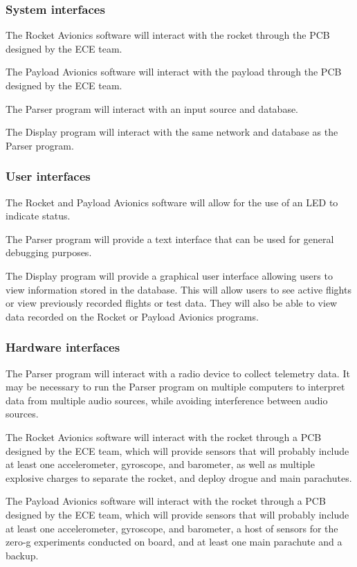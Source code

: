 \documentclass[onecolumn, draftclsnofoot, 10pt, compsoc]{IEEEtran}
\begin{document}
\subsubsection{System interfaces}
The Rocket Avionics software will interact with the rocket through the PCB designed by the ECE team.

The Payload Avionics software will interact with the payload through the PCB designed by the ECE team.

The Parser program will interact with an input source and database.

The Display program will interact with the same network and database as the Parser program.

\subsubsection{User interfaces}
The Rocket and Payload Avionics software will allow for the use of an LED to indicate status.

The Parser program will provide a text interface that can be used for general debugging purposes.

The Display program will provide a graphical user interface allowing users to view information stored in the database. This will allow users to see active flights or view previously recorded flights or test data.  They will also be able to view data recorded on the Rocket or Payload Avionics programs.

\subsubsection{Hardware interfaces}
The Parser program will interact with a radio device to collect telemetry data.  It may be necessary to run the Parser program on multiple computers to interpret data from multiple audio sources, while avoiding interference between audio sources.

The Rocket Avionics software will interact with the rocket through a PCB designed by the ECE team, which will provide sensors that will probably include at least one accelerometer, gyroscope, and barometer, as well as multiple explosive charges to separate the rocket, and deploy drogue and main parachutes.

The Payload Avionics software will interact with the rocket through a PCB designed by the ECE team, which will provide sensors that will probably include at least one accelerometer, gyroscope, and barometer, a host of sensors for the zero-g experiments conducted on board, and at least one main parachute and a backup. 
\end{document}
